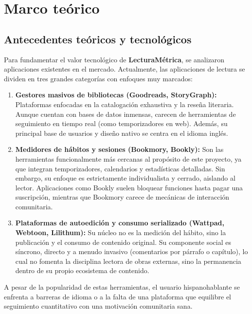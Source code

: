 \documentclass[12pt, atypical, journal]{article}
\begin{document}
\newpage

\section{Marco teórico}

\subsection{Antecedentes teóricos y tecnológicos}

Para fundamentar el valor tecnológico de \textbf{LecturaMétrica}, se analizaron aplicaciones existentes en el mercado. Actualmente, las aplicaciones de lectura se dividen en tres grandes categorías con enfoques muy marcados:

\begin{enumerate}
    \item \textbf{Gestores masivos de bibliotecas (Goodreads, StoryGraph):} Plataformas enfocadas en la catalogación exhaustiva y la reseña literaria. Aunque cuentan con bases de datos inmensas, carecen de herramientas de seguimiento en tiempo real (como temporizadores en web). Además, su principal base de usuarios y diseño nativo se centra en el idioma inglés.
    \item \textbf{Medidores de hábitos y sesiones (Bookmory, Bookly):} Son las herramientas funcionalmente más cercanas al propósito de este proyecto, ya que integran temporizadores, calendarios y estadísticas detalladas. Sin embargo, su enfoque es estrictamente individualista y cerrado, aislando al lector. Aplicaciones como Bookly suelen bloquear funciones hasta pagar una suscripción, mientras que Bookmory carece de mecánicas de interacción comunitaria.
    \item \textbf{Plataformas de autoedición y consumo serializado (Wattpad, Webtoon, Lilithum):} Su núcleo no es la medición del hábito, sino la publicación y el consumo de contenido original. Su componente social es síncrono, directo y a menudo invasivo (comentarios por párrafo o capítulo), lo cual no fomenta la disciplina lectora de obras externas, sino la permanencia dentro de su propio ecosistema de contenido.
\end{enumerate}

A pesar de la popularidad de estas herramientas, el usuario hispanohablante se enfrenta a barreras de idioma o a la falta de una plataforma que equilibre el seguimiento cuantitativo con una motivación comunitaria sana.
\end{document}
